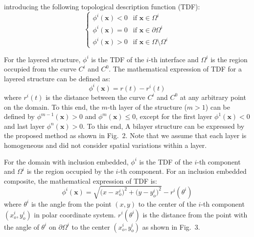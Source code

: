 \documentclass[11pt]{article}
\begin{document}
\newpage

\setcounter{equation}{7}

\noindent
introducing the following topological description function (TDF):
\begin{equation}
\begin{cases}
\phi^i(\mathbf{x}) < 0 & \text{if } \mathbf{x} \in \Omega^i \\
\phi^i(\mathbf{x}) = 0 & \text{if } \mathbf{x} \in \partial\Omega^i \\
\phi^i(\mathbf{x}) > 0 & \text{if } \mathbf{x} \in \Omega \setminus \Omega^i
\end{cases}
\end{equation}

For the layered structure, $\phi^i$ is the TDF of the $i$-th
interface and $\Omega^i$ is the region occupied from the curve $C^i$
and $C^0$. The mathematical expression of TDF for a layered structure
can be defined as:
\begin{equation}
\phi^i(\mathbf{x}) = r(t) - r^i(t)
\end{equation}
where $r^i(t)$ is the distance between the curve $C^i$ and $C^0$ at
any arbitrary point on the domain. To this end, the $m$-th layer of
the structure ($m > 1$) can be defined by $\phi^{m-1}(\mathbf{x}) > 0$
and $\phi^{m}(\mathbf{x}) \leq 0$, except for the first layer
$\phi^{1}(\mathbf{x}) < 0$ and last layer $\phi^{n}(\mathbf{x}) > 0$.
To this end, A bilayer structure can be expressed by the proposed
method as shown in Fig.~2. Note that we assume that each layer is
homogeneous and did not consider spatial variations within a layer.

For the domain with inclusion embedded, $\phi^i$ is the TDF of the
$i$-th component and $\Omega^i$ is the region occupied by the $i$-th
component. For an inclusion embedded composite, the mathematical
expression of TDF is:
\begin{equation}
\phi^i(\mathbf{x}) = \sqrt{\bigl(x - x_o^i\bigr)^{2}
                           + \bigl(y - y_o^i\bigr)^{2}}
                     - r^i\!\left(\theta^i\right)
\end{equation}
where $\theta^i$ is the angle from the point $(x, y)$ to the center
of the $i$-th component $\left(x_o^i, y_o^i\right)$ in polar
coordinate system. $r^i(\theta^i)$ is the distance from the point
with the angle of $\theta^i$ on $\partial\Omega^i$ to the center
$\left(x_o^i, y_o^i\right)$ as shown in Fig.~3.
\end{document}
